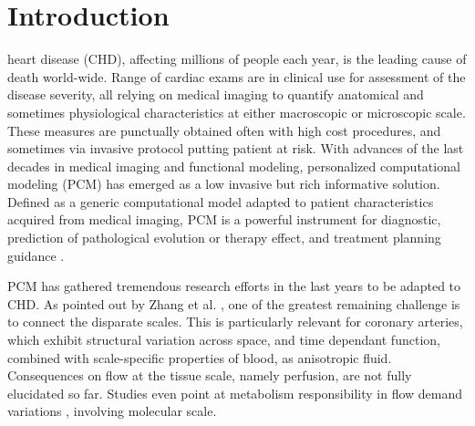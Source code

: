 \documentclass[journal]{IEEEtran}
\begin{document}
\section{Introduction}
% 
% 
% 
% 
 heart disease (CHD), affecting millions of people each year, is the leading cause of death world-wide.
Range of cardiac exams are in clinical use for assessment of the disease severity, all relying on medical imaging to quantify anatomical and sometimes physiological characteristics at either macroscopic or microscopic scale. These measures are punctually obtained often with high cost procedures, and sometimes via invasive protocol putting patient at risk.
With advances of the last decades in medical imaging and functional modeling, personalized computational modeling (PCM) has emerged as a low invasive but rich informative solution. Defined as a generic computational model adapted to patient characteristics acquired from medical imaging, PCM is a powerful instrument for diagnostic, prediction of pathological evolution or therapy effect, and treatment planning guidance \cite{ayache2016medical}. %


PCM has gathered tremendous research efforts in the last years to be adapted to CHD.
As pointed out by Zhang et al. \cite{zhang2016multi}, one of the greatest remaining challenge is to connect the disparate scales. This is particularly relevant for coronary arteries, which exhibit structural variation across space, and time dependant function, combined with scale-specific properties of blood, as anisotropic fluid. Consequences on flow at the tissue scale, namely perfusion, are not fully elucidated so far. Studies even point at metabolism responsibility in flow demand variations \cite{decking2002spatial}, involving molecular scale.
\end{document}
